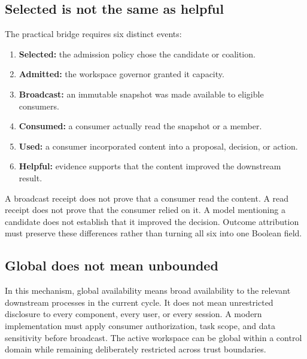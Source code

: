 
\subsection{Selected is not the same as helpful}

The practical bridge requires six distinct events:
\begin{enumerate}
  \item \textbf{Selected:} the admission policy chose the candidate or coalition.
  \item \textbf{Admitted:} the workspace governor granted it capacity.
  \item \textbf{Broadcast:} an immutable snapshot was made available to eligible consumers.
  \item \textbf{Consumed:} a consumer actually read the snapshot or a member.
  \item \textbf{Used:} a consumer incorporated content into a proposal, decision, or action.
  \item \textbf{Helpful:} evidence supports that the content improved the downstream result.
\end{enumerate}

A broadcast receipt does not prove that a consumer read the content. A read receipt does not prove that the consumer relied on it. A model mentioning a candidate does not establish that it improved the decision. Outcome attribution must preserve these differences rather than turning all six into one Boolean field.

\subsection{Global does not mean unbounded}

In this mechanism, global availability means broad availability to the relevant downstream processes in the current cycle. It does not mean unrestricted disclosure to every component, every user, or every session. A modern implementation must apply consumer authorization, task scope, and data sensitivity before broadcast. The active workspace can be global within a control domain while remaining deliberately restricted across trust boundaries.

